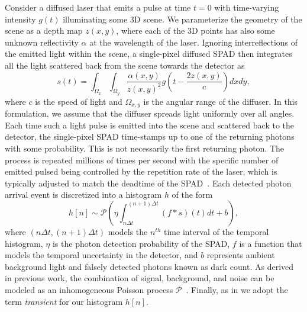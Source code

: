 Consider a diffused laser that emits a pulse at time $t = 0$ with time-varying intensity $g(t)$ illuminating some 3D scene. We parameterize the geometry of the scene as a depth map $z(x, y)$, where each of the 3D points has also some unknown reflectivity $\alpha$ at the wavelength of the laser. Ignoring interreflections of the emitted light within the scene, a single-pixel diffused SPAD then integrates all the light scattered back from the scene towards the detector as
%
\begin{equation}
	s \left( t \right)= \int_{\Omega_x} \int_{\Omega_y} \frac{\alpha \left( x,y \right)}{z(x,y)^2}  g \left( t - \frac{2z(x,y)}{c} \right) dx dy ,
	\label{eq:pulse_integral} 
\end{equation}  
%
where $c$ is the speed of light and $\Omega_{x,y}$ is the angular range of the diffuser. In this formulation, we assume that the diffuser spreads light uniformly over all angles. Each time such a light pulse is emitted into the scene and scattered back to the detector, the single-pixel SPAD time-stamps up to one of the returning photons with some probability. This is not necessarily the first returning photon. The process is repeated millions of times per second with the specific number of emitted pulsed being controlled by the repetition rate of the laser, which is typically adjusted to match the deadtime of the SPAD~\cite{Heide:2018}. Each detected photon arrival event is discretized into a histogram $h$ of the form
%
\begin{equation}
  h[n] \sim \mathcal{P} \left( \eta \int_{n\Delta t}^{(n+1)\Delta t} \left(f * s \right) \left( t \right)  dt + b \right),	
	\label{eq:spad_measurements}
\end{equation}
%
where $(n\Delta t, (n+1) \Delta t)$ models the $n^{th}$ time interval of the
temporal histogram, $\eta$ is the photon detection probability of the SPAD, $f$
is a function that models the temporal uncertainty in the detector, and $b$
represents ambient background light and falsely detected photons known as dark
count. As derived in previous work, the combination of signal, background, and
noise can be modeled as an inhomogeneous Poisson process
$\mathcal{P}$~\cite{Kirmani:2014,Shin2015}. Finally, as in \cite{Xin2019} we adopt the term
\textit{transient} for our histogram $h[n]$.

